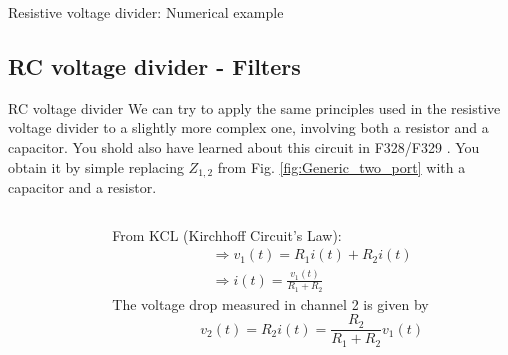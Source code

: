 \begin{frame}{Resistive voltage divider: Numerical example}

\end{frame}

\subsection{RC voltage divider - Filters}

\begin{frame}{RC voltage divider}
We can try to apply the same principles used in the resistive voltage divider to a slightly more complex one, involving both a resistor and a capacitor. You shold also have learned about this circuit in F328/F329 \cite{Walker:2008aa}. You obtain it by 			simple replacing $Z_{1,2}$ from Fig. \ref{fig:Generic_two_port} with a capacitor and a resistor.
	\begin{columns}
		\begin{column}{0.5\textwidth}
				\end{column}
		\begin{column}{0.5\textwidth}
		From KCL (Kirchhoff Circuit's Law):
			\begin{eqnarray}
			\Rightarrow v_1(t)=R_1 i(t)+ R_2 i(t)\\
			\Rightarrow i(t)=\frac{v_1(t)}{R_1+R_2}
			\label{eq:voltagediv_i}
  			\end{eqnarray}
		The voltage drop measured in channel 2 is given by
		\begin{equation}
  			v_2(t)=R_2 i(t)=\frac{R_2}{R_1+R_2}v_1(t)
  			\label{eq:voltagediv_v2}
		\end{equation}
		
		\end{column}
	\end{columns}
\end{frame}




